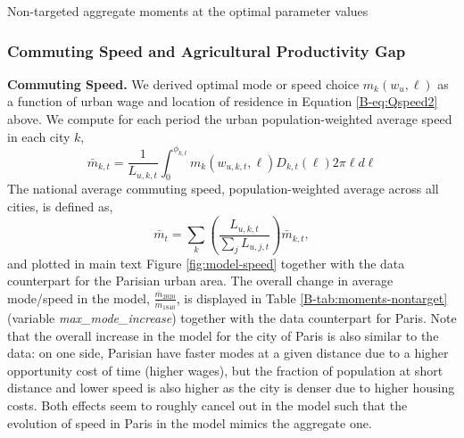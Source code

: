 \documentclass[11pt]{report}
\newcommand{\modtables}{../../output/model/tables}
\begin{document}
\begin{table}[h]
	\centering
	
	\caption{Non-targeted aggregate moments at the optimal parameter values\label{B-tab:moments-nontarget}}
\end{table}

\subsubsection{Commuting Speed and Agricultural Productivity Gap}\label{B-sec:speed-and-apg}

\textbf{Commuting Speed.} We derived optimal mode or speed choice $m_k(w_u,\ell)$ as a function of urban wage and location of residence in Equation \eqref{B-eq:Qspeed2} above. We compute for each period the urban population-weighted average speed in each city $k$,
\begin{equation*}
\bar{m}_{k,t}	=\frac{1}{L_{u,k,t}}\int_0^{\phi_{k,t}} m_k(w_{u,k,t},\ell) D_{k,t}(\ell) 2 \pi \ell d \ell
\end{equation*}
The national average commuting speed, population-weighted average across all cities, is defined as,
\begin{equation*}
\bar{m}_{t}	= \sum_k \left( \frac{L_{u,k,t}}{\sum_j L_{u,j,t}}\right)\bar{m}_{k,t}, 
\end{equation*}
and plotted in main text Figure \ref{fig:model-speed} together with the data counterpart for the Parisian urban area. The overall change in average mode/speed in the model, $\frac{\bar{m}_{2020}}{\bar{m}_{1840}}$, is displayed in Table \ref{B-tab:moments-nontarget} (variable \emph{max\_mode\_increase}) together with the data counterpart for Paris. Note that the overall increase in the model for the city of Paris is also similar to the data: on one side, Parisian have faster modes at a given distance due to a higher opportunity cost of time (higher wages), but the fraction of population at short distance and lower speed is also higher as the city is denser due to higher housing costs. Both effects seem to roughly cancel out in the model such that the evolution of speed in Paris in the model mimics the aggregate one.
 
\end{document}
